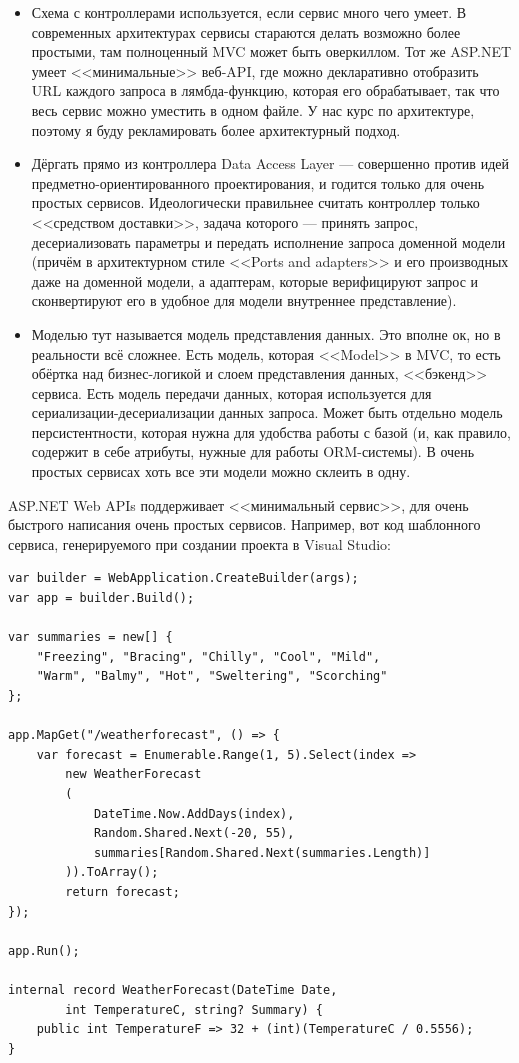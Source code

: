 \documentclass[a5paper]{article}
\begin{document}
\begin{itemize}
    \item Схема с контроллерами используется, если сервис много чего умеет. В современных архитектурах сервисы стараются делать возможно более простыми, там полноценный MVC может быть оверкиллом. Тот же ASP.NET умеет <<минимальные>> веб-API, где можно декларативно отобразить URL каждого запроса в лямбда-функцию, которая его обрабатывает, так что весь сервис можно уместить в одном файле. У нас курс по архитектуре, поэтому я буду рекламировать более архитектурный подход.
    \item Дёргать прямо из контроллера Data Access Layer --- совершенно против идей предметно-ориентированного проектирования, и годится только для очень простых сервисов. Идеологически правильнее считать контроллер только <<средством доставки>>, задача которого --- принять запрос, десериализовать параметры и передать исполнение запроса доменной модели (причём в архитектурном стиле <<Ports and adapters>> и его производных даже на доменной модели, а адаптерам, которые верифицируют запрос и сконвертируют его в удобное для модели внутреннее представление).
    \item Моделью тут называется модель представления данных. Это вполне ок, но в реальности всё сложнее. Есть модель, которая <<Model>> в MVC, то есть обёртка над бизнес-логикой и слоем представления данных, <<бэкенд>> сервиса. Есть модель передачи данных, которая используется для сериализации-десериализации данных запроса. Может быть отдельно модель персистентности, которая нужна для удобства работы с базой (и, как правило, содержит в себе атрибуты, нужные для работы ORM-системы). В очень простых сервисах хоть все эти модели можно склеить в одну.
\end{itemize}

ASP.NET Web APIs поддерживает <<минимальный сервис>>, для очень быстрого написания очень простых сервисов. Например, вот код шаблонного сервиса, генерируемого при создании проекта в Visual Studio:

\begin{footnotesize}
    \begin{verbatim}
var builder = WebApplication.CreateBuilder(args);
var app = builder.Build();

var summaries = new[] {
    "Freezing", "Bracing", "Chilly", "Cool", "Mild", 
    "Warm", "Balmy", "Hot", "Sweltering", "Scorching"
};

app.MapGet("/weatherforecast", () => {
    var forecast = Enumerable.Range(1, 5).Select(index =>
        new WeatherForecast
        (
            DateTime.Now.AddDays(index),
            Random.Shared.Next(-20, 55),
            summaries[Random.Shared.Next(summaries.Length)]
        )).ToArray();
        return forecast;
});

app.Run();

internal record WeatherForecast(DateTime Date, 
        int TemperatureC, string? Summary) {
    public int TemperatureF => 32 + (int)(TemperatureC / 0.5556);
}
    \end{verbatim}
\end{footnotesize}
\end{document}

